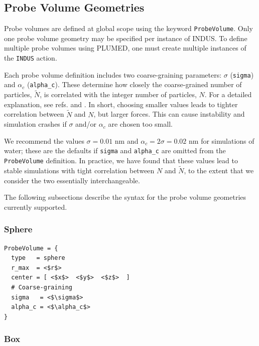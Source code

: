 \documentclass[11pt,notitlepage]{article}
\begin{document}

\subsection{Probe Volume Geometries}

Probe volumes are defined at global scope using the keyword \texttt{ProbeVolume}. Only one probe volume geometry may be specified per instance of INDUS. To define multiple probe volumes using PLUMED, one must create multiple instances of the \texttt{INDUS} action.

Each probe volume definition includes two coarse-graining parameters: $\sigma$
(\texttt{sigma}) and $\alpha_c$ (\texttt{alpha\_c}). These determine how closely the coarse-grained number of particles, $\tilde{N}$, is correlated with the integer number of particles, $N$. For a detailed explanation, see refs. \cite{Patel2010} and \cite{Patel2012}. In short, choosing smaller values leads to tighter correlation between $\tilde{N}$ and $N$, but larger forces. This can cause instability and simulation crashes if $\sigma$ and/or $\alpha_c$ are chosen too small. 

We recommend the values $\sigma = 0.01$ nm and $\alpha_c = 2 \sigma = 0.02$ nm for simulations of water; these are the defaults if \texttt{sigma} and \texttt{alpha\_c} are omitted from the \texttt{ProbeVolume} definition. In practice, we have found that these values lead to stable simulations with tight correlation between $N$ and $\tilde{N}$, to the extent that we consider the two essentially interchangeable.

The following subsections describe the syntax for the probe volume geometries currently supported.


\subsubsection{Sphere}

\begin{lstlisting}
ProbeVolume = {
  type   = sphere
  r_max  = <$r$>
  center = [ <$x$>  <$y$>  <$z$>  ]
  # Coarse-graining
  sigma   = <$\sigma$>
  alpha_c = <$\alpha_c$>
}
\end{lstlisting}


\subsubsection{Box}
\end{document}
